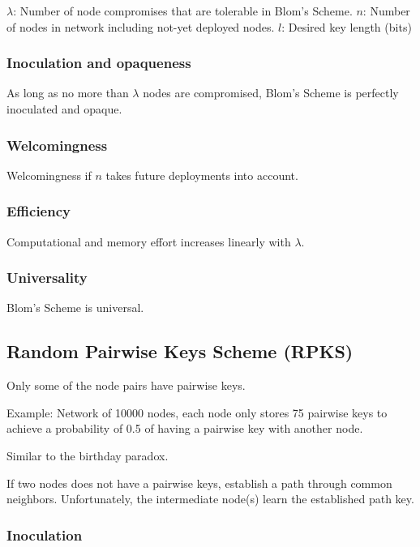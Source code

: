 \documentclass[10pt]{article}
\begin{document}
$\lambda$: Number of node compromises that are tolerable in Blom's Scheme.
$n$: Number of nodes in network including not-yet deployed nodes.
$l$: Desired key length (bits)


\subsubsection{Inoculation and opaqueness}

As long as no more than $\lambda$ nodes are compromised, Blom's Scheme is perfectly inoculated and opaque. 


\subsubsection{Welcomingness}

Welcomingness if $n$ takes future deployments into account.

\subsubsection{Efficiency}

Computational and memory effort increases linearly with $\lambda$.

\subsubsection{Universality}

Blom's Scheme is universal.



\subsection{Random Pairwise Keys Scheme (RPKS)}

\noindent

Only some of the node pairs have pairwise keys.

Example: Network of 10000 nodes, each node only stores 75 pairwise keys to achieve a probability of 0.5 of having a pairwise key with another node.

Similar to the birthday paradox.

If two nodes does not have a pairwise keys, establish a path through common neighbors. Unfortunately, the intermediate node(s) learn the established path key.


\subsubsection{Inoculation}
\end{document}
